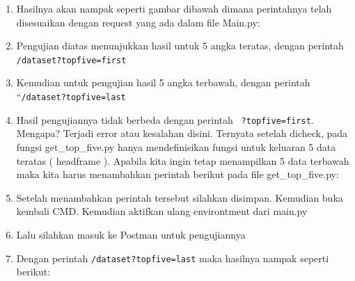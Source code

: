 \begin{enumerate}
\item Hasilnya akan nampak seperti gambar dibawah dimana perintahnya telah disesuaikan dengan request yang ada dalam file Main.py:
\item Pengujian diatas menunjukkan hasil untuk 5 angka teratas, dengan perintah \verb|/dataset?topfive=first|
\item Kemudian untuk pengujian hasil 5 angka terbawah, dengan perintah “\verb|/dataset?topfive=last|
\item Hasil pengujiannya tidak berbeda dengan perintah \verb| ?topfive=first|. Mengapa? Terjadi error atau kesalahan disini. Ternyata setelah dicheck, pada fungsi get\_top\_five.py hanya mendefinisikan fungsi untuk keluaran 5 data teratas ( headframe ). Apabila kita ingin tetap menampilkan 5 data terbawah maka kita harus menambahkan perintah berikut pada file get\_top\_five.py:
\item Setelah menambahkan perintah tersebut silahkan disimpan. Kemudian buka kembali CMD. Kemudian aktifkan ulang environtment dari main.py
\item Lalu silahkan masuk ke Postman untuk pengujiannya
\item Dengan perintah \verb|/dataset?topfive=last| maka hasilnya nampak seperti berikut:
\end{enumerate}

